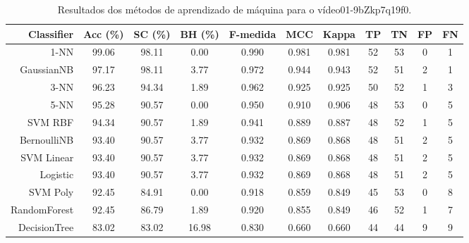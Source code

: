 \begin{table}[!htb]
\centering
\caption{Resultados dos métodos de aprendizado de máquina para o vídeo01-9bZkp7q19f0.}
\label{tab:01-9bZkp7q19f0}
\begin{tabular}{r|c|c|c|c|c|c|c|c|c|c}
\hline\hline
Classifier & Acc (\%) & SC (\%) & BH (\%) & F-medida & MCC & Kappa & TP & TN & FP & FN \\ \hline
1-NN & 99.06 & 98.11 & 0.00 & 0.990 & 0.981 & 0.981 & 52 & 53 & 0 & 1 \\ 
GaussianNB & 97.17 & 98.11 & 3.77 & 0.972 & 0.944 & 0.943 & 52 & 51 & 2 & 1 \\ 
3-NN & 96.23 & 94.34 & 1.89 & 0.962 & 0.925 & 0.925 & 50 & 52 & 1 & 3 \\ 
5-NN & 95.28 & 90.57 & 0.00 & 0.950 & 0.910 & 0.906 & 48 & 53 & 0 & 5 \\ 
SVM RBF & 94.34 & 90.57 & 1.89 & 0.941 & 0.889 & 0.887 & 48 & 52 & 1 & 5 \\ 
BernoulliNB & 93.40 & 90.57 & 3.77 & 0.932 & 0.869 & 0.868 & 48 & 51 & 2 & 5 \\ 
SVM Linear & 93.40 & 90.57 & 3.77 & 0.932 & 0.869 & 0.868 & 48 & 51 & 2 & 5 \\ 
Logistic & 93.40 & 90.57 & 3.77 & 0.932 & 0.869 & 0.868 & 48 & 51 & 2 & 5 \\ 
SVM Poly & 92.45 & 84.91 & 0.00 & 0.918 & 0.859 & 0.849 & 45 & 53 & 0 & 8 \\ 
RandomForest & 92.45 & 86.79 & 1.89 & 0.920 & 0.855 & 0.849 & 46 & 52 & 1 & 7 \\ 
DecisionTree & 83.02 & 83.02 & 16.98 & 0.830 & 0.660 & 0.660 & 44 & 44 & 9 & 9 \\ 
\hline\hline
\end{tabular}
\end{table}
